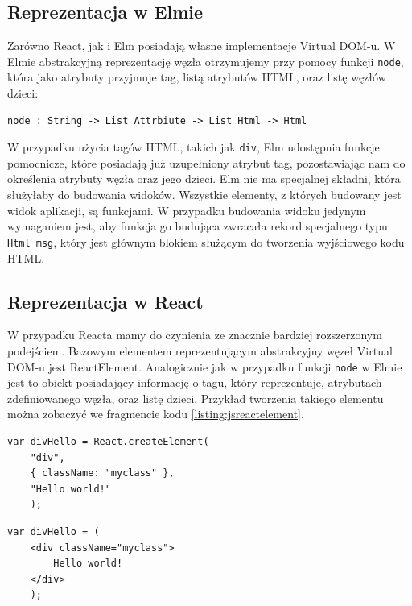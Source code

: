 \subsection{Reprezentacja w Elmie}
Zarówno React, jak i Elm posiadają własne implementacje Virtual DOM-u. W Elmie abstrakcyjną reprezentację węzła otrzymujemy przy pomocy funkcji \lstinline{node}, która jako atrybuty przyjmuje tag, listą atrybutów HTML, oraz listę węzłów dzieci:
\begin{lstlisting}[style=elm-style]
	node : String -> List Attrbiute -> List Html -> Html
\end{lstlisting}
W przypadku użycia tagów HTML, takich jak \lstinline{div}, Elm udostępnia funkcje pomocnicze, które posiadają już uzupełniony atrybut tag, pozostawiając nam do określenia atrybuty węzła oraz jego dzieci. Elm nie ma specjalnej składni, która służyłaby do budowania widoków. Wszystkie elementy, z których budowany jest widok aplikacji, są funkcjami. W przypadku budowania widoku jedynym wymaganiem jest, aby funkcja go budująca zwracała rekord specjalnego typu \lstinline[style=elm-style]{Html msg}, który jest głównym blokiem służącym do tworzenia wyjściowego kodu HTML.

\subsection{Reprezentacja w React}
W przypadku Reacta mamy do czynienia ze znacznie bardziej rozszerzonym podejściem.  Bazowym elementem reprezentującym abstrakcyjny węzeł Virtual DOM-u jest ReactElement. Analogicznie jak w przypadku funkcji \lstinline{node} w Elmie jest to obiekt posiadający informację o tagu, który reprezentuje, atrybutach zdefiniowanego węzła, oraz listę dzieci. Przykład tworzenia takiego elementu można zobaczyć we fragmencie kodu \ref{listing:jsreactelement}. 

\begin{minipage}{.45\textwidth}
	\begin{lstlisting}[caption=Javascript,style=JavaScript,label = listing:jsreactelement]
	var divHello = React.createElement(
	"div",
	{ className: "myclass" },
	"Hello world!"
	);
	\end{lstlisting}
\end{minipage}\hfill
\begin{minipage}{.45\textwidth}
	\begin{lstlisting}[caption=JSX,style=JavaScript,firstnumber=1,label = listing:jsx]
	var divHello = (
	<div className="myclass">
		Hello world!
	</div>
	);
	\end{lstlisting}
\end{minipage}

